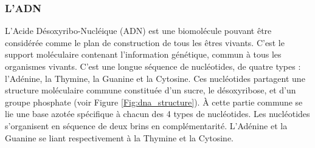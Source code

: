 \subsubsection{L'ADN}

L'Acide Désoxyribo-Nucléique (ADN) est une biomolécule pouvant être considérée comme le plan de construction de tous les êtres vivants. C'est le support moléculaire contenant l'information génétique, commun à tous les organismes vivants. C'est une longue séquence de nucléotides, de quatre types : l'Adénine, la Thymine, la Guanine et la Cytosine. Ces nucléotides partagent une structure moléculaire commune constituée d'un sucre, le désoxyribose, et d'un groupe phosphate (voir Figure \ref{Fig:dna_structure}). À cette partie commune se lie une base azotée spécifique à chacun des 4 types de nucléotides. Les nucléotides s'organisent en séquence de deux brins en complémentarité. L'Adénine et la Guanine se liant respectivement à la Thymine et la Cytosine.

